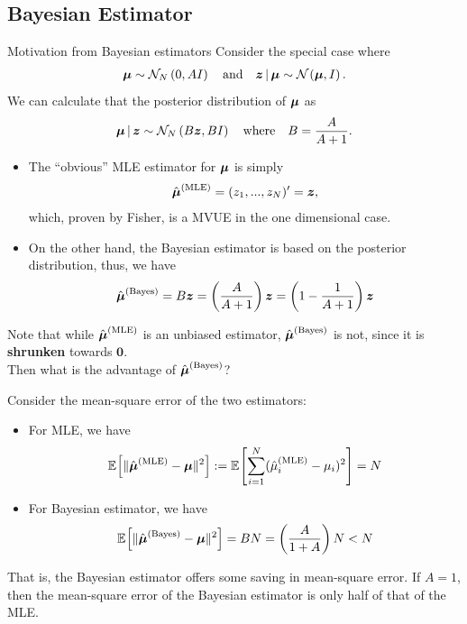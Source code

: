 \documentclass{beamer}
\begin{document}
\subsection{Bayesian Estimator}

\begin{frame}{Motivation from Bayesian estimators}
	Consider the special case where
	\begin{align*}
		\bfmu\sim\normal[N]{0,AI}
		\quad \text{and} \quad
		\bfz\given\bfmu\sim\normal{\bfmu,I}.
	\end{align*}
	We can calculate that the posterior distribution of $\bfmu$ as
	\begin{align*}
		\bfmu\given \bfz \sim \normal[N]{B\bfz,BI}
		\quad\text{where}\quad
		B = \frac{A}{A+1}.
	\end{align*}
\end{frame}

\begin{frame}{}
	\begin{itemize}
		\item
			The ``obvious'' MLE estimator for $\bfmu$ is simply
			\begin{align*}
				\hat{\bfmu}^{\text{(MLE)}} = (z_1,...,z_N)' = \bfz,
			\end{align*}
			which, proven by Fisher, is a MVUE in the one dimensional case.
		\item
			On the other hand, the Bayesian estimator is based on the posterior
			distribution, thus, we have
			\begin{align*}
				\hat{\bfmu}^{\text{(Bayes)}}
				= B\bfz
				= \left(\frac{A}{A+1}\right)\bfz
				= \left(1-\frac{1}{A+1}\right)\bfz
			\end{align*}
	\end{itemize}
	Note that while $\hat{\bfmu}^{\text{(MLE)}}$ is an unbiased estimator,
	$\hat{\bfmu}^{\text{(Bayes)}}$ is not,
	since it is \textbf{shrunken} towards $\boldsymbol{0}$. \\
	Then what is the advantage of $\hat{\bfmu}^{\text{(Bayes)}}$?
\end{frame}

\begin{frame}{}
	Consider the mean-square error of the two estimators:
	\begin{itemize}
		\item
			For MLE, we have
			\begin{align*}
				\E{\|\hat{\bfmu}^{\text{(MLE)}}-\bfmu\|^2}
				:= \E{\sum_{i=1}^{N}(\hat{\mu}_i^{\text{(MLE)}}-\mu_i)^2}
				= N
			\end{align*}
		\item
			For Bayesian estimator, we have
			\begin{align*}
				\E{\|\hat{\bfmu}^{\text{(Bayes)}}-\bfmu\|^2}
				= BN
				= \left(\frac{A}{1+A}\right)N
				< N
			\end{align*}
	\end{itemize}
	That is, the Bayesian estimator offers some saving in mean-square error.
	If $A=1$, then the mean-square error of the Bayesian estimator
	is only half of that of the MLE.
\end{frame}
\end{document}
